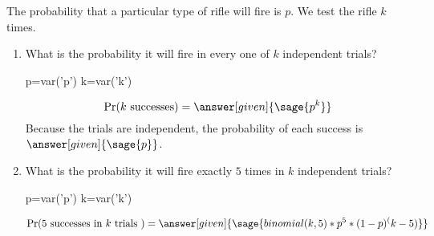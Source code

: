 \documentclass{ximera}
\begin{document}
\hspace{1cm}

\begin{problem}
The probability that a particular type of rifle will fire is $p$. We test the rifle $k$ times.
\begin{enumerate}
\item What is the probability it will fire in every one of $k$ independent trials? 
\begin{explanation}
\begin{sagesilent}
p=var('p')
k=var('k')
\end{sagesilent}

\begin{equation*} 
\Pr(k \text{ successes} ) = \answer[given]{\sage{p^k}}
\end{equation*}
Because the trials are independent, the probability of each success is $\answer[given]{\sage{p}}$.

\end{explanation}


\item What is the probability it will fire exactly $5$ times in $k$ independent trials? 
\begin{explanation}
\begin{sagesilent}
p=var('p')
k=var('k')
\end{sagesilent}
\begin{equation*} 
\Pr(5 \text{ successes in  } k \text{ trials } ) = \answer[given]{\sage{binomial(k,5)*p^5*(1-p)^(k-5)}} 
\end{equation*}
\end{explanation}

\end{enumerate}
\end{problem}
\end{document}
